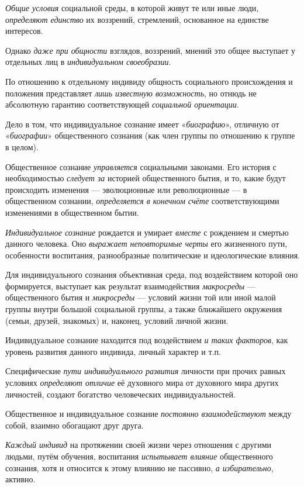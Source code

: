 \documentclass[a4paper,14pt,russian]{extreport}
\begin{document}
\emph{Общие условия} социальной среды, в которой живут те или иные люди, \emph{определяют единство} их воззрений, стремлений, основанное на единстве интересов.

Однако \emph{даже при общности} взглядов, воззрений, мнений это общее выступает у отдельных лиц в \emph{индивидуальном своеобразии}.

По отношению к отдельному индивиду общность социального происхождения и положения представляет \emph{лишь известную возможность}, но отнюдь не абсолютную гарантию соответствующей \emph{социальной ориентации}.

Дело в том, что индивидуальное сознание имеет «\emph{биографию}», отличную от «\emph{биографии}» общественного сознания (как член группы по отношению к группе в целом).

Общественное сознание \emph{управляется} социальными законами. Его история с необходимостью \emph{следует за} историей общественного бытия, и то, какие будут происходить изменения --- эволюционные или революционные --- в общественном сознании, \emph{определяется в конечном счёте} соответствующими изменениями в общественном бытии.

\emph{Индивидуальное сознание} рождается и умирает \emph{вместе} с рождением и смертью данного человека. Оно \emph{выражает неповторимые черты} его жизненного пути, особенности воспитания, разнообразные политические и идеологические влияния.

Для индивидуального сознания объективная среда, под воздействием которой оно формируется, выступает как результат взаимодействия \emph{макросреды} --- общественного бытия и \emph{микросреды} --- условий жизни той или иной малой группы внутри большой социальной группы, а также ближайшего окружения (семьи, друзей, знакомых) и, наконец, условий личной жизни.

Индивидуальное сознание находится под воздействием \emph{и таких факторов}, как уровень развития данного индивида, личный характер и т.п.

Специфические \emph{пути индивидуального развития} личности при прочих равных условиях \emph{определяют отличие} её духовного мира от духовного мира других личностей, создают богатство человеческих индивидуальностей.

Общественное и индивидуальное сознание \emph{постоянно взаимодействуют} между собой, взаимно обогащают друг друга.

\emph{Каждый индивид} на протяжении своей жизни через отношения с другими людьми, путём обучения, воспитания \emph{испытывает влияние} общественного сознания, хотя и относится к этому влиянию не пассивно, \emph{а избирательно}, активно.
\end{document}
